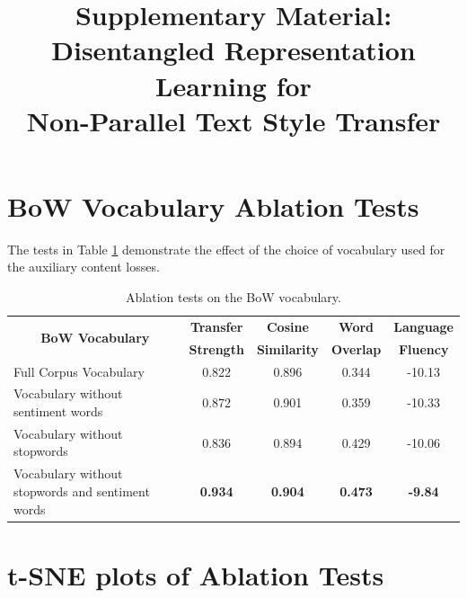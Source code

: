 \documentclass[letterpaper]{article}
\title{Supplementary Material:\\Disentangled Representation Learning for\\Non-Parallel Text Style Transfer}
\date{}
\author{}
\begin{document}
\maketitle
\graphicspath{{images/}}

\newcommand{\tabh}[1]{\multicolumn{1}{c|}{\textbf{#1}}}
\newcommand{\tabc}[2]{\multicolumn{1}{|c||}{\multirow{#1}{*}{\textbf{#2}}}}

\newcommand{\loss}[1]{J_{\text{#1}}}

\section{BoW Vocabulary Ablation Tests}

The tests in Table \ref{tab:bow-vocab-ablation} demonstrate the effect of the choice of vocabulary used for the auxiliary content losses.

\begin{table}[ht]
	\centering
	\begin{tabular}{| l || c | c | c | c |}
		\hline
		\tabc{2}{BoW Vocabulary}                         & \tabh{Transfer} & \tabh{Cosine}     & \tabh{Word}    & \tabh{Language} \\
		                                                 & \tabh{Strength} & \tabh{Similarity} & \tabh{Overlap} & \tabh{Fluency}  \\
		\hline
		\hline
		Full Corpus Vocabulary                           & 0.822           & 0.896             & 0.344          & -10.13          \\
		\hline
		Vocabulary without sentiment words               & 0.872           & 0.901             & 0.359          & -10.33          \\
		\hline
		Vocabulary without stopwords                     & 0.836           & 0.894             & 0.429          & -10.06          \\
		\hline
		Vocabulary without stopwords and sentiment words & \textbf{0.934}  & \textbf{0.904}    & \textbf{0.473} & \textbf{-9.84}  \\
		\hline
	\end{tabular}
	\caption{Ablation tests on the BoW vocabulary.}
	\label{tab:bow-vocab-ablation}
\end{table}


\section{t-SNE plots of Ablation Tests}
\end{document}
